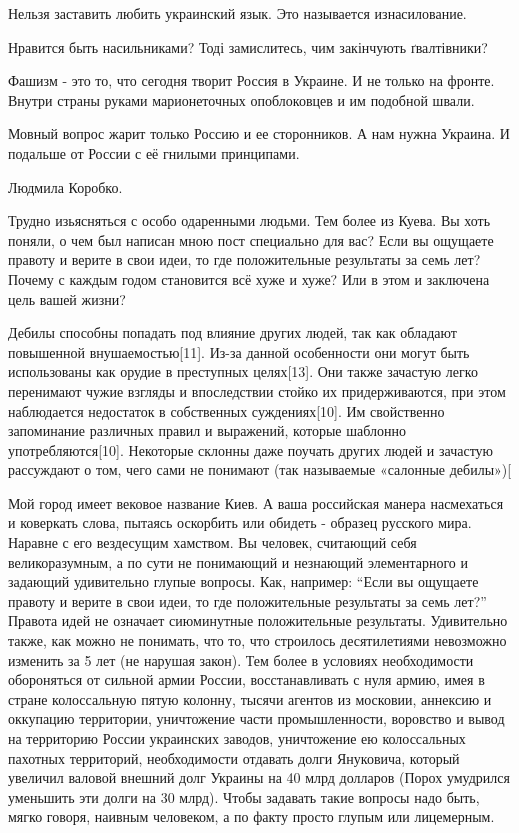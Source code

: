 \begin{itemize}
Нельзя заставить любить украинский язык. Это называется изнасилование.

Нравится быть насильниками? Тоді замислитесь, чим закінчують ґвалтівники?



Фашизм - это то, что сегодня творит Россия в Украине. И не только на фронте.
Внутри страны руками марионеточных опоблоковцев и им подобной швали.

Мовный вопрос жарит только Россию и ее сторонников. А нам нужна Украина. И
подальше от России с её гнилыми принципами.

Людмила Коробко.

Трудно изьясняться с особо одаренными людьми. Тем более из Куева. Вы хоть
поняли, о чем был написан мною пост специально для вас? Если вы ощущаете
правоту и верите в свои идеи, то где положительные результаты за семь лет?
Почему с каждым годом становится всё хуже и хуже? Или в этом и заключена цель
вашей жизни?

Дебилы способны попадать под влияние других людей, так как обладают повышенной
внушаемостью[11]. Из-за данной особенности они могут быть использованы как
орудие в преступных целях[13]. Они также зачастую легко перенимают чужие
взгляды и впоследствии стойко их придерживаются, при этом наблюдается
недостаток в собственных суждениях[10]. Им свойственно запоминание различных
правил и выражений, которые шаблонно употребляются[10]. Некоторые склонны даже
поучать других людей и зачастую рассуждают о том, чего сами не понимают (так
называемые «салонные дебилы»)[


Мой город имеет вековое название Киев. А ваша российская манера насмехаться и
коверкать слова, пытаясь оскорбить или обидеть - образец русского мира. Наравне
с его вездесущим хамством. Вы человек, считающий себя великоразумным, а по сути
не понимающий и незнающий элементарного и задающий удивительно глупые вопросы.
Как, например: \enquote{Если вы ощущаете правоту и верите в свои идеи, то где
положительные результаты за семь лет?} Правота идей не означает сиюминутные
положительные результаты. Удивительно также, как можно не понимать, что то, что
строилось десятилетиями невозможно изменить за 5 лет (не нарушая закон). Тем
более в условиях необходимости обороняться от сильной армии России,
восстанавливать с нуля армию, имея в стране колоссальную пятую колонну, тысячи
агентов из московии, аннексию и оккупацию территории, уничтожение части
промышленности, воровство и вывод на территорию России украинских заводов,
уничтожение ею колоссальных пахотных территорий, необходимости отдавать долги
Януковича, который увеличил валовой внешний долг Украины на 40 млрд долларов
(Порох умудрился уменьшить эти долги на 30 млрд). Чтобы задавать такие вопросы
надо быть, мягко говоря, наивным человеком, а по факту просто глупым или
лицемерным.

\end{itemize}

